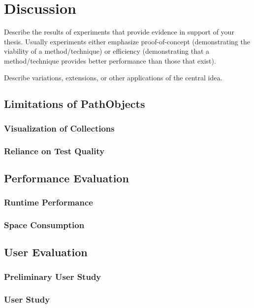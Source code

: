 \chapter{Discussion}
\label{c:discussion}

Describe the results of experiments that provide evidence in support of your thesis. Usually experiments either emphasize proof-of-concept (demonstrating the viability of a method/technique) or efficiency (demonstrating that a method/technique provides better performance than those that exist).

Describe variations, extensions, or other applications of the central idea.

\section{Limitations of PathObjects}
\subsection{Visualization of Collections}
\subsection{Reliance on Test Quality}

\section{Performance Evaluation}
\subsection{Runtime Performance}
\subsection{Space Consumption}

\section{User Evaluation}
\subsection{Preliminary User Study}
\subsection{User Study}